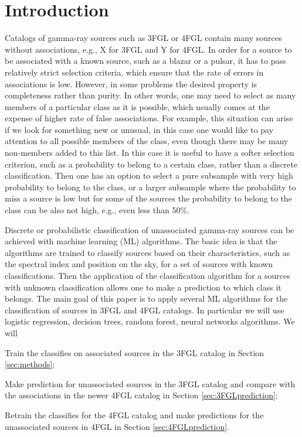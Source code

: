 \section{Introduction}


Catalogs of gamma-ray sources such as 3FGL or 4FGL contain many sources without associations, e.g., X for 3FGL and Y for 4FGL.
In order for a source to be associated with a known source, such as a blazar or a pulsar, it has to pass relatively strict selection criteria, which ensure that the rate of errors in associations is low.
However, in some problems the desired property is completeness rather than purity. In other words, one may need to select as many members of a particular class as it is possible, which usually comes at the expense of higher rate of false associations.
For example, this situation can arise if we look for something new or unusual, in this case one would like to pay attention to all possible members of the class, even though there may be many non-members added to this list.
In this case it is useful to have a softer selection criterion, such as a probability to belong to a certain class, rather than a discrete classification.
Then one has an option to select a pure subsample with very high probability to belong to the class, or a larger subsample where the probability to miss a source is low but for some of the sources the probability to belong to the class can be also not high, e.g., even less than 50\%.

Discrete or probabilistic classification of unassociated gamma-ray sources can be achieved with machine learning (ML) algorithms.
The basic idea is that the algorithms are trained to classify sources based on their characteristics, such as the spectral index and position on the sky, for a set of sources with known classifications. Then the application of the classification algorithm for a sources with unknown classification allows one to make a prediction to which class it belongs.
The main goal of this paper is to apply several ML algorithms for the classification of sources in 3FGL and 4FGL catalogs.
In particular we will use logistic regression, decision trees, random forest, neural networks algorithms.
We will 
\ben
\item
Train the classifies on associated sources in the 3FGL catalog in Section \ref{sec:methods};
\item
Make prediction for unassociated sources in the 3FGL catalog and compare with the associations in the newer 4FGL catalog in Section \ref{sec:3FGLprediction};
\item
Retrain the classifies for the 4FGL catalog and make predictions for the unassociated sources in 4FGL in Section \ref{sec:4FGLprediction}.
\een

